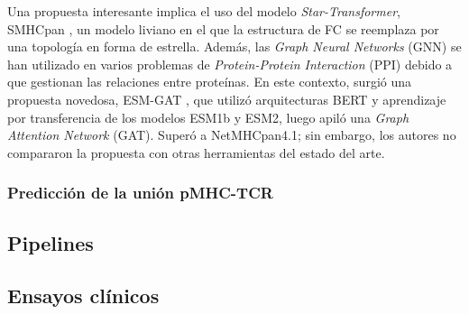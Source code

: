 Una propuesta interesante implica el uso del modelo \textit{Star-Transformer}, SMHCpan \citep{ye2023stmhcpan}, un modelo liviano en el que la estructura de FC se reemplaza por una topología en forma de estrella. Además, las \textit{Graph Neural Networks} (GNN) se han utilizado en varios problemas de \textit{Protein-Protein Interaction} (PPI) debido a que gestionan las relaciones entre proteínas. En este contexto, surgió una propuesta novedosa, ESM-GAT \citep{hashemi2023improved}, que utilizó arquitecturas BERT y aprendizaje por transferencia de los modelos ESM1b y ESM2, luego apiló una \textit{Graph Attention Network} (GAT). Superó a NetMHCpan4.1; sin embargo, los autores no compararon la propuesta con otras herramientas del estado del arte.

\subsubsection{Predicción de la unión pMHC-TCR}



\subsection{Pipelines}
\subsection{Ensayos clínicos}

